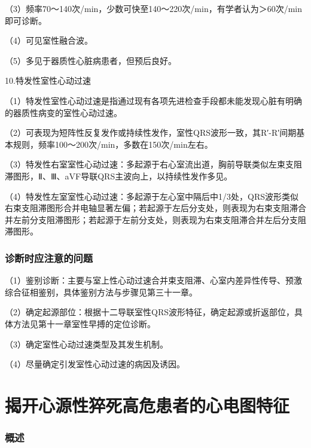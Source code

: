 （3）频率70～140次/min，少数可快至140～220次/min，有学者认为＞60次/min即可诊断。

（4）可见室性融合波。

（5）多见于器质性心脏病患者，但预后良好。

10.特发性室性心动过速

（1）特发性室性心动过速是指通过现有各项先进检查手段都未能发现心脏有明确的器质性病变的室性心动过速。

（2）可表现为短阵性反复发作或持续性发作，室性QRS波形一致，其R′-R′间期基本规则，频率100～200次/min，多数在150次/min左右。

（3）特发性右室室性心动过速：多起源于右心室流出道，胸前导联类似左束支阻滞图形，Ⅱ、Ⅲ、aVF导联QRS主波向上，以持续性发作多见。

（4）特发性左室室性心动过速：多起源于左心室中隔后中1/3处，QRS波形类似右束支阻滞图形合并电轴显著左偏；若起源于左后分支处，则表现为右束支阻滞合并左前分支阻滞图形；若起源于左前分支处，则表现为右束支阻滞合并左后分支阻滞图形。

\protect\hypertarget{text00040.htmlux5cux23subid447}{}{}

\subsection{诊断时应注意的问题}

（1）鉴别诊断：主要与室上性心动过速合并束支阻滞、心室内差异性传导、预激综合征相鉴别，具体鉴别方法与步骤见第三十一章。

（2）确定起源部位：根据十二导联室性QRS波形特征，确定起源或折返部位，具体方法见第十一章室性早搏的定位诊断。

（3）确定室性心动过速类型及其发生机制。

（4）尽量确定引发室性心动过速的病因及诱因。

\protect\hypertarget{text00041.html}{}{}

\protect\hypertarget{text00041.htmlux5cux23chapter41}{}{}

\chapter{揭开心源性猝死高危患者的心电图特征}

\protect\hypertarget{text00041.htmlux5cux23subid448}{}{}

\subsection{概述}

